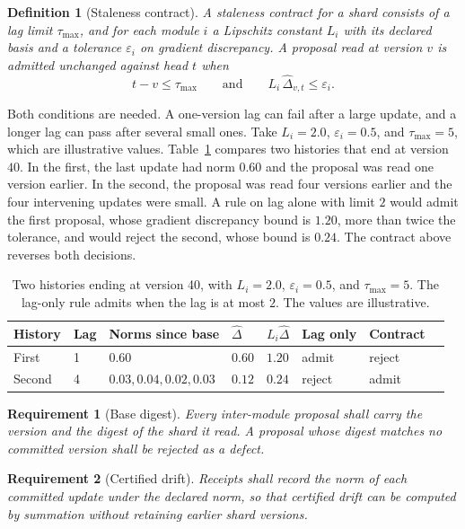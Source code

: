 \documentclass[11pt,openany]{book}
\newtheorem{definition}{Definition}[chapter]
\newtheorem{requirement}{Requirement}[chapter]
\theoremstyle{remark}
\begin{document}
\begin{definition}[Staleness contract]
A staleness contract for a shard consists of a lag limit $\tau_{\max}$, and for each module $i$ a Lipschitz constant $L_i$ with its declared basis and a tolerance $\varepsilon_i$ on gradient discrepancy. A proposal read at version $v$ is admitted unchanged against head $t$ when
\[
t-v\le\tau_{\max}\qquad\text{and}\qquad L_i\,\hat\Delta_{v,t}\le\varepsilon_i .
\]
\end{definition}

Both conditions are needed. A one-version lag can fail after a large update, and a longer lag can pass after several small ones. Take $L_i=2.0$, $\varepsilon_i=0.5$, and $\tau_{\max}=5$, which are illustrative values. Table~\ref{tab:stale} compares two histories that end at version $40$. In the first, the last update had norm $0.60$ and the proposal was read one version earlier. In the second, the proposal was read four versions earlier and the four intervening updates were small. A rule on lag alone with limit $2$ would admit the first proposal, whose gradient discrepancy bound is $1.20$, more than twice the tolerance, and would reject the second, whose bound is $0.24$. The contract above reverses both decisions.

\begin{table}[t]
\centering
\small
\begin{tabular}{@{}llllllll@{}}
\toprule
History & Lag & Norms since base & $\hat\Delta$ & $L_i\hat\Delta$ & Lag only & Contract \\
\midrule
First & 1 & $0.60$ & $0.60$ & $1.20$ & admit & reject \\
Second & 4 & $0.03,0.04,0.02,0.03$ & $0.12$ & $0.24$ & reject & admit \\
\bottomrule
\end{tabular}
\caption{Two histories ending at version 40, with $L_i=2.0$, $\varepsilon_i=0.5$, and $\tau_{\max}=5$. The lag-only rule admits when the lag is at most $2$. The values are illustrative.}\label{tab:stale}
\end{table}

\begin{requirement}[Base digest]
Every inter-module proposal shall carry the version and the digest of the shard it read. A proposal whose digest matches no committed version shall be rejected as a defect.
\end{requirement}

\begin{requirement}[Certified drift]
Receipts shall record the norm of each committed update under the declared norm, so that certified drift can be computed by summation without retaining earlier shard versions.
\end{requirement}
\end{document}
